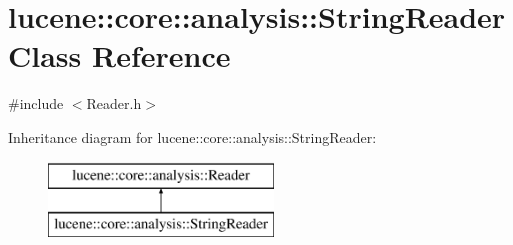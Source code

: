 \hypertarget{classlucene_1_1core_1_1analysis_1_1StringReader}{}\section{lucene\+:\+:core\+:\+:analysis\+:\+:String\+Reader Class Reference}
\label{classlucene_1_1core_1_1analysis_1_1StringReader}


{\ttfamily \#include $<$Reader.\+h$>$}

Inheritance diagram for lucene\+:\+:core\+:\+:analysis\+:\+:String\+Reader\+:\begin{figure}[H]
\begin{center}
\leavevmode
\includegraphics[height=2.000000cm]{classlucene_1_1core_1_1analysis_1_1StringReader}
\end{center}
\end{figure}
